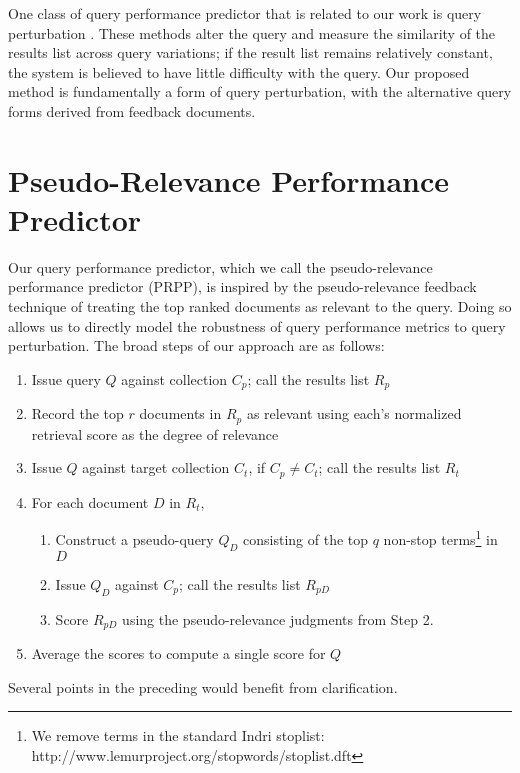 \documentclass{sig-alternate}
\begin{document}
One class of query performance predictor that is related to our work is query perturbation \cite{Vinay2006, Yom-Tov2005, Zhou2007}. These methods alter the query and measure the similarity of the results list across query variations; if the result list remains relatively constant, the system is believed to have little difficulty with the query. Our proposed method is fundamentally a form of query perturbation, with the alternative query forms derived from feedback documents.

\section{Pseudo-Relevance Performance Predictor}\label{section.method}

Our query performance predictor, which we call the pseudo-relevance performance predictor (PRPP), is inspired by the pseudo-relevance feedback technique of treating the top ranked documents as relevant to the query. Doing so allows us to directly model the robustness of query performance metrics to query perturbation. The broad steps of our approach are as follows:

\begin{enumerate}
	\item Issue query $Q$ against collection $C_p$; call the results list $R_p$
	\item Record the top $r$ documents in $R_p$ as relevant using each's normalized retrieval score as the degree of relevance
	\item Issue $Q$ against target collection $C_t$, if $C_p \neq C_t$; call the results list $R_t$
	\item For each document $D$ in $R_t$,
	\begin{enumerate}
		\item Construct a pseudo-query $Q_D$ consisting of the top $q$ non-stop terms\footnote{We remove terms in the standard Indri stoplist: http://www.lemurproject.org/stopwords/stoplist.dft} in $D$
		\item Issue $Q_D$ against $C_p$; call the results list $R_{pD}$
		\item Score $R_{pD}$ using the pseudo-relevance judgments from Step 2.
	\end{enumerate}
	\item Average the scores to compute a single score for $Q$
\end{enumerate}

\noindent Several points in the preceding would benefit from clarification.
\end{document}
